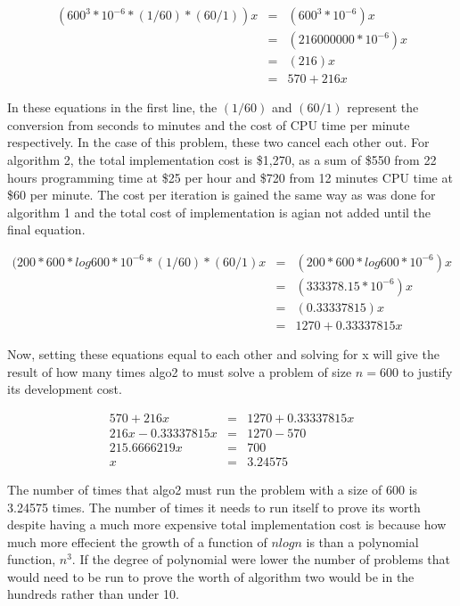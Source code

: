 \documentclass[11pt]{article}
\begin{document}
\begin{eqnarray*}
(600^3*10^{-6}*(1/60)*(60/1))x &=& (600^3*10^{-6})x \\
&=& (216000000*10^{-6})x \\
&=& (216)x \\
&=& 570 + 216x
\end{eqnarray*}

In these equations in the first line, the $(1/60)$ and $(60/1)$ represent the conversion from seconds to minutes and the cost of CPU time per minute respectively. In the case of this problem, these two cancel each other out. For algorithm 2, the total implementation cost is \$1,270, as a sum of \$550 from 22 hours programming time at \$25 per hour and \$720 from 12 minutes CPU time at \$60 per minute. The cost per iteration is gained the same way as was done for algorithm 1 and the total cost of implementation is agian not added until the final equation.

\begin{eqnarray*}
(200*600*log600*10^{-6}* (1/60)*(60/1)x &=& (200*600*log600*10^{-6})x \\
&=& (333378.15*10^{-6})x\\
&=& (0.33337815)x\\
&=& 1270 + 0.33337815x
\end{eqnarray*}

Now, setting these equations equal to each other and solving for x will give the result of how many times algo2 to must solve a problem of size $n=600$ to justify its development cost.

\begin{eqnarray*}
570 + 216x &=& 1270 + 0.33337815x \\
216x - 0.33337815x &=& 1270-570\\
215.6666219x &=& 700 \\
x &=& 3.24575
\end{eqnarray*}

The number of times that algo2 must run the problem with a size of 600 is 3.24575 times. The number of times it needs to run itself to prove its worth despite having a much more expensive total implementation cost is because how much more effecient the growth of a function of $nlogn$ is than a polynomial function, $n^3$. If the degree of polynomial were lower the number of problems that would need to be run to prove the worth of algorithm two would be in the hundreds rather than under 10. 

\end{document}
